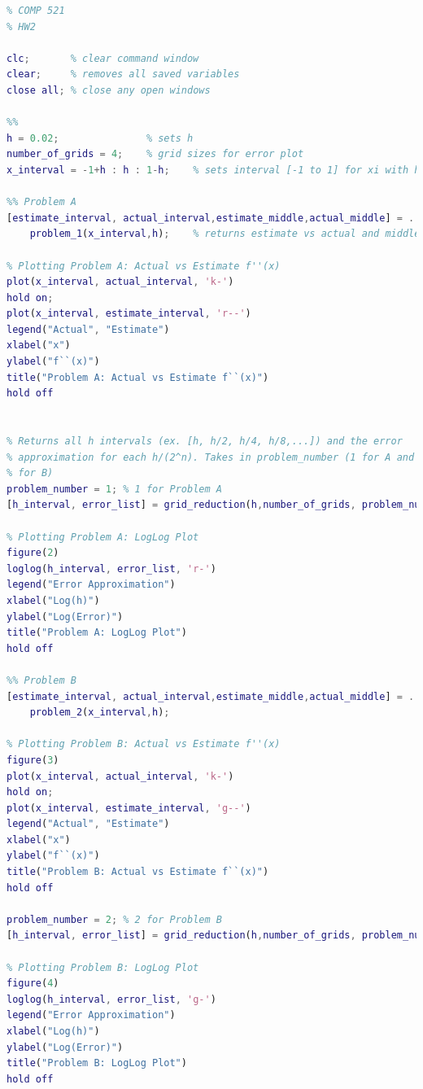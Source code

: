 \documentclass[10pt,letterpaper]{article}
\begin{document}
\pagebreak

 \begin{lstlisting}[language = Matlab]
%% Zack Humphries
% COMP 521
% HW2

clc;       % clear command window
clear;     % removes all saved variables
close all; % close any open windows

%%
h = 0.02;               % sets h
number_of_grids = 4;    % grid sizes for error plot
x_interval = -1+h : h : 1-h;    % sets interval [-1 to 1] for xi with h gap

%% Problem A
[estimate_interval, actual_interval,estimate_middle,actual_middle] = ...
    problem_1(x_interval,h);    % returns estimate vs actual and middle estimate vs actual for reference

% Plotting Problem A: Actual vs Estimate f''(x)
plot(x_interval, actual_interval, 'k-')
hold on;
plot(x_interval, estimate_interval, 'r--')
legend("Actual", "Estimate")
xlabel("x")
ylabel("f``(x)")
title("Problem A: Actual vs Estimate f``(x)")
hold off


% Returns all h intervals (ex. [h, h/2, h/4, h/8,...]) and the error
% approximation for each h/(2^n). Takes in problem_number (1 for A and 2
% for B)
problem_number = 1; % 1 for Problem A
[h_interval, error_list] = grid_reduction(h,number_of_grids, problem_number);

% Plotting Problem A: LogLog Plot
figure(2)
loglog(h_interval, error_list, 'r-')
legend("Error Approximation")
xlabel("Log(h)")
ylabel("Log(Error)")
title("Problem A: LogLog Plot")
hold off

%% Problem B
[estimate_interval, actual_interval,estimate_middle,actual_middle] = ...
    problem_2(x_interval,h);

% Plotting Problem B: Actual vs Estimate f''(x)
figure(3)
plot(x_interval, actual_interval, 'k-')
hold on;
plot(x_interval, estimate_interval, 'g--')
legend("Actual", "Estimate")
xlabel("x")
ylabel("f``(x)")
title("Problem B: Actual vs Estimate f``(x)")
hold off

problem_number = 2; % 2 for Problem B
[h_interval, error_list] = grid_reduction(h,number_of_grids, problem_number);

% Plotting Problem B: LogLog Plot
figure(4)
loglog(h_interval, error_list, 'g-')
legend("Error Approximation")
xlabel("Log(h)")
ylabel("Log(Error)")
title("Problem B: LogLog Plot")
hold off


\end{lstlisting}
\end{document}

